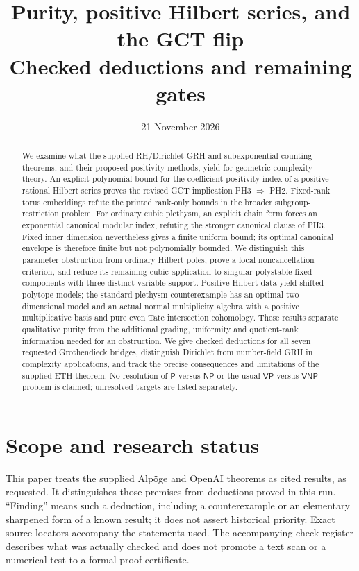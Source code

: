 \documentclass[11pt,a4paper]{article}
\title{Purity, positive Hilbert series, and the GCT flip\\[5pt]\large Checked deductions and remaining gates}
\author{}
\date{21 November 2026}
\begin{document}
\maketitle
\begin{abstract}
We examine what the supplied RH/Dirichlet-GRH and subexponential counting
theorems, and their proposed positivity methods, yield for geometric
complexity theory. An explicit polynomial bound for the coefficient
positivity index of a positive rational Hilbert series proves the revised
GCT implication PH3 $\Rightarrow$ PH2. Fixed-rank torus embeddings refute
the printed rank-only bounds in the broader subgroup-restriction problem.
For ordinary cubic plethysm, an explicit chain form forces an exponential
canonical modular index, refuting the stronger canonical clause of PH3.
Fixed inner dimension nevertheless gives a finite uniform bound; its
optimal canonical envelope is therefore finite but not polynomially
bounded. We distinguish this parameter obstruction from ordinary
Hilbert poles, prove a local noncancellation criterion, and reduce its
remaining cubic application to singular polystable fixed components
with three-distinct-variable support. Positive Hilbert data yield shifted polytope models; the
standard plethysm counterexample has an optimal two-dimensional model
and an actual normal multiplicity algebra with a positive multiplicative
basis and pure even Tate intersection cohomology. These results separate qualitative purity
from the additional grading, uniformity and quotient-rank information
needed for an obstruction. We give checked deductions for all seven
requested Grothendieck bridges, distinguish Dirichlet from number-field
GRH in complexity applications, and track the precise consequences and
limitations of the supplied ETH theorem. No resolution of $\mathsf P$
versus $\mathsf{NP}$ or the usual $\mathsf{VP}$ versus $\mathsf{VNP}$
problem is claimed; unresolved targets are listed separately.
\end{abstract}
{\small\setlength{\parskip}{0pt}\tableofcontents}
\clearpage


\section*{Scope and research status}
This paper treats the supplied Alp\"oge and OpenAI theorems as cited
results, as requested. It distinguishes those premises from deductions
proved in this run. ``Finding'' means such a deduction, including a
counterexample or an elementary sharpened form of a known result; it does
not assert historical priority. Exact source locators accompany the
statements used. The accompanying check register describes what was
actually checked and does not promote a text scan or a numerical test to
a formal proof certificate.
\end{document}

